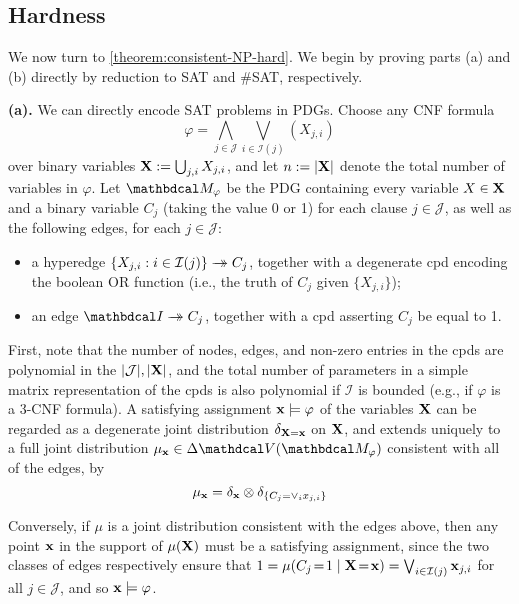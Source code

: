 \subsection{Hardness}
    \label{proofs:hardness-results}

We now turn to \cref{theorem:consistent-NP-hard}. We begin by proving
parts (a) and (b) directly
by reduction to SAT and \#SAT, respectively.

\begin{lproof} \label{proof:consistent-NP-hard}
    \textbf{(a).}
	We can directly encode SAT problems in PDGs.
	Choose any CNF formula
	$$\varphi = \bigwedge_{j \in \mathcal J} \bigvee_{i \in \mathcal I(j)} (X_{j,i})$$
	over binary variables $\mathbf X := \bigcup_{j,i} X_{j,i}$,
    and let $n := |\mathbf X|$ denote the total number of variables in $\varphi$.
    Let
	$\dg M_\varphi$ be the PDG containing every variable $X \in \mathbf X$ and a binary
	variable $C_j$ (taking the value 0 or 1) for each clause $j \in \mathcal J$, as well as the following edges, for each $j \in \mathcal J$:
	\begin{itemize}
		\item a hyperedge $\{X_{j,i} : i \in \mathcal I(j)\} \rightarrow\mathrel{\mspace{-15mu}}\rightarrow C_j$, together with a degenerate cpd
			encoding the boolean OR function (i.e., the truth of $C_j$ given $\{X_{j,i}\}$);
		\item an edge $\pdgunit \tto C_j$, together with a cpd asserting $C_j$ be equal to 1.
	\end{itemize}
	First, note that the number of nodes, edges, and non-zero entries in the cpds are polynomial in the $|\mathcal J|, |\mathbf X|$, and the total number of parameters in a simple matrix representation of the cpds is also polynomial if $\mathcal I$ is bounded (e.g., if $\varphi$ is a 3-CNF formula).
	A satisfying assignment $\mathbf x \models \varphi$ of the variables $\mathbf X$ can be regarded as a degenerate joint distribution $\delta_{\mathbf X = \mathbf x}$ on $\mathbf X$, and extends uniquely to a full joint distribution $\mu_{\mat x} \in \Delta \V(\dg M_\varphi)$ consistent with all of the edges, by
	\[ \mu_{\mathbf x} = \delta_{\mathbf x} \otimes \delta_{\{C_j = \vee_i  x_{j,i}\}} \]

 	Conversely, if $\mu$ is a joint distribution consistent with the edges above, then any point $\mathbf x$ in the support of $\mu(\mathbf X)$ must be a satisfying assignment, since the two classes of edges respectively ensure that $1 =\mu(C_j\!=\! 1 \mid \mathbf X \!=\! \mathbf x) = \bigvee_{i \in \mathcal I(j)} \mathbf x_{j,i}$ for all $j \in \mathcal J$, and so $\mathbf x \models \varphi$.


\end{lproof}

